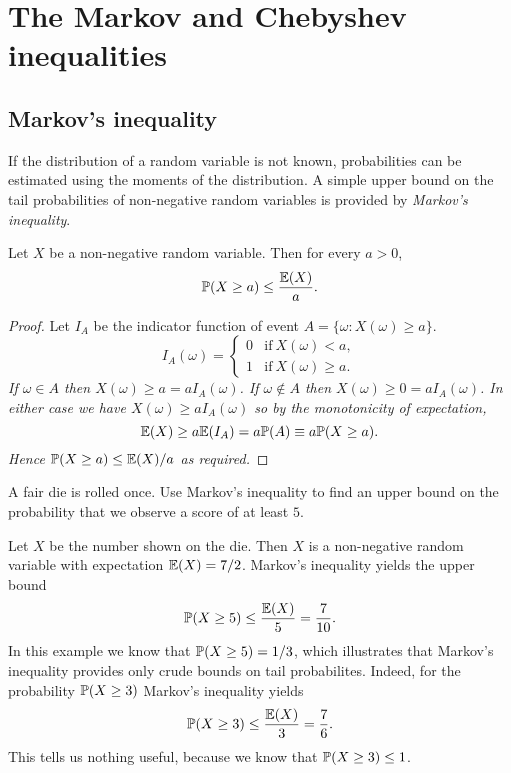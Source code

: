
\section{The Markov and Chebyshev inequalities}\label{sec:conc}

\subsection{Markov's inequality}

If the distribution of a random variable is not known, probabilities can be estimated using the moments of the distribution. A simple upper bound on the tail probabilities of non-negative random variables is provided by \emph{Markov's inequality}.

\begin{theorem}
Let $X$ be a non-negative random variable. Then for every $a>0$,
\[
\mathbb{P}(X\geq a) \leq \frac{\mathbb{E}(X)}{a}.
\]
\end{theorem}

\begin{proof}
Let $I_A$ be the indicator function of event $A = \{\omega: X(\omega)\geq a\}$. 
\[
I_A(\omega) = \left\{\begin{array}{ll} 0 & \text{if}\ X(\omega) < a, \\ 1 & \text{if}\ X(\omega)\geq a. \end{array}\right.
\]
\bit
\it If $\omega\in A$ then $X(\omega)   \geq a = a I_A(\omega)$.
\it If $\omega\notin A$ then $X(\omega)\geq 0 = a I_A(\omega)$.
\eit
In either case we have $X(\omega)\geq a I_A(\omega)$ so by the monotonicity of expectation,
\[
\mathbb{E}(X) \geq a\mathbb{E}(I_A) = a\mathbb{P}(A) \equiv a\mathbb{P}(X\geq a).
\]
Hence $\mathbb{P}(X\geq a) \leq \mathbb{E}(X)/a$ as required.
\end{proof}

\begin{example}
A fair die is rolled once. Use Markov's inequality to find an upper bound on the probability that we observe a score of at least $5$.
\end{example}

\begin{solution}
Let $X$ be the number shown on the die. Then $X$ is a non-negative random variable with expectation $\mathbb{E}(X) = 7/2$.
Markov's inequality yields the upper bound 
\[
\mathbb{P}(X\geq 5) \leq \frac{\mathbb{E}(X)}{5} = \frac{7}{10}.
\]
In this example we know that $\mathbb{P}(X\geq 5)=1/3$, which illustrates that Markov's inequality provides only crude bounds on tail probabilites. Indeed, for the probability $\mathbb{P}(X\geq 3)$ Markov's inequality yields
\[
\mathbb{P}(X\geq 3) \leq \frac{\mathbb{E}(X)}{3} = \frac{7}{6}.
\]
This tells us nothing useful, because we know that $\mathbb{P}(X\geq 3)\leq 1$. 
\end{solution}
